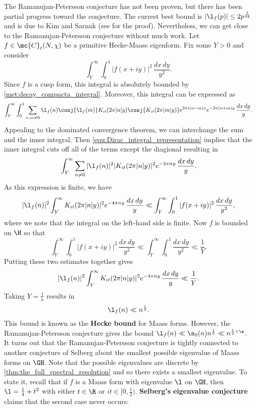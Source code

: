     The Ramanujan-Petersson conjecture has not been proven, but there has been partial progress toward the conjecture. The currest best bound is $|\l_{f}(p)| \le 2p^{\frac{7}{64}}$ and is due to Kim and Sarnak (see \cite{kim2003functoriality} for the proof). Nevertheless, we can get close to the Ramanujan-Petersson conjecture without much work. Let $f \in \mc{C}_{t}(N,\chi)$ be a primitive Hecke-Maass eigenform. Fix some $Y > 0$ and consider
    \[
      \int_{Y}^{\infty}\int_{0}^{1}|f(x+iy)|^{2}\,\frac{dx\,dy}{y^{2}}.
    \]
    Since $f$ is a cusp form, this integral is absolutely bounded by \cref{met:decay_compacta_integral}.
    Moreover, this integral can be expressed as
    \[
      \int_{Y}^{\infty}\int_{0}^{1}\sum_{n,m \neq 0}\l_{f}(n)\conj{\l_{f}(m)}K_{it}(2\pi|n|y)\conj{K_{it}(2\pi|m|y)}e^{2\pi i(n-m)x}e^{-2\pi(n+m)y}\,\frac{dx\,dy}{y}.
    \]
    Appealing to the dominated convergence theorem, we can interchange the sum and the inner integral. Then \cref{equ:Dirac_integral_representation} implies that the inner integral cuts off all of the terms except the diagional resulting in
    \[
      \int_{Y}^{\infty}\sum_{n \neq 0}|\l_{f}(n)|^{2}|K_{it}(2\pi|n|y)|^{2}e^{-4\pi ny}\,\frac{dx\,dy}{y}.
    \]
    As this expression is finite, we have
    \[
      |\l_{f}(n)|^{2}\int_{Y}^{\infty}K_{it}(2\pi|n|y)|^{2}e^{-4\pi ny}\,\frac{dx\,dy}{y} \ll \int_{Y}^{\infty}\int_{0}^{1}|f(x+iy)|^{2}\,\frac{dx\,dy}{y^{2}},
    \]
    where we note that the integral on the left-hand side is finite. Now $f$ is bounded on $\H$ so that
    \[
      \int_{Y}^{\infty}\int_{0}^{1}|f(x+iy)|^{2}\,\frac{dx\,dy}{y^{2}} \ll \int_{Y}^{\infty}\int_{0}^{1}\frac{dx\,dy}{y^{2}} \ll \frac{1}{Y}.
    \]
    Putting these two estimates together gives
    \[
      |\l_{f}(n)|^{2}\int_{Y}^{\infty}K_{it}(2\pi|n|y)|^{2}e^{-4\pi ny}\,\frac{dx\,dy}{y} \ll \frac{1}{Y}.
    \]
    Taking $Y = \frac{1}{n}$ results in
    \[
      \l_{f}(n) \ll n^{\frac{1}{2}}.
    \]
    This bound is known as the \textbf{Hecke bound} for Maass forms. However, the Ramanujan-Petersson conjecture gives the bound $\l_{f}(n) \ll \s_{0}(n)n^{\frac{1}{2}} \ll n^{\frac{1}{2}+\e}$. It turns out that the Ramanujan-Petersson conjecture is tightly connected to another conjecture of Selberg about the smallest possible eigenvalue of Maass forms on $\GH$. Note that the possible eigenvalues are discrete by \cref{thm:the_full_spectral_resolution} and so there exists a smallest eigenvalue. To state it, recall that if $f$ is a Maass form with eigenvalue $\l$ on $\GH$, then $\l = \frac{1}{4}+t^{2}$ with either $t \in \R$ or $it \in [0,\frac{1}{2})$. \textbf{Selberg's eigenvalue conjecture} claims that the second case never occurs:

